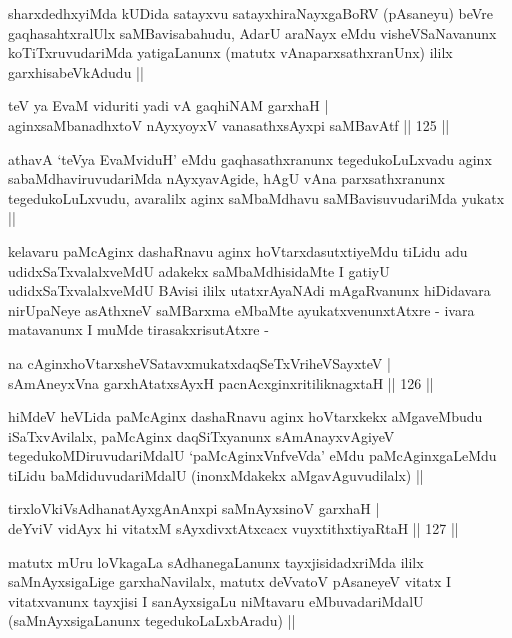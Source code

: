 \begin{artha}
sharxdedhxyiMda kUDida satayxvu satayxhiraNayxgaBoRV (pAsaneyu) beVre
gaqhasahtxralUlx saMBavisabahudu, AdarU araNayx eMdu visheVSaNavanunx
koTiTxruvudariMda yatigaLanunx (matutx vAnaparxsathxranUnx) ililx
garxhisabeVkAdudu ||
\end{artha}


\begin{shl}
teV ya EvaM viduriti yadi vA gaqhiNAM garxhaH | \\
aginxsaMbanadhxtoV nAyxyoyxV vanasathxsAyxpi saMBavAtf \hfill|| 125 || 
\end{shl}

\begin{artha}
athavA `teVya EvaMviduH' eMdu gaqhasathxranunx tegedukoLuLxvadu aginx
sabaMdhaviruvudariMda nAyxyavAgide, hAgU vAna parxsathxranunx
tegedukoLuLxvudu, avaralilx aginx saMbaMdhavu saMBavisuvudariMda
yukatx ||
\end{artha}

\begin{artha}
kelavaru paMcAginx dashaRnavu aginx hoVtarxdasutxtiyeMdu tiLidu adu
udidxSaTxvalalxveMdU adakekx saMbaMdhisidaMte I gatiyU
udidxSaTxvalalxveMdU BAvisi ililx utatxrAyaNAdi mAgaRvanunx hiDidavara
nirUpaNeye asAthxneV saMBarxma eMbaMte ayukatxvenunxtAtxre - ivara
matavanunx I muMde tirasakxrisutAtxre -
\end{artha}

\begin{shl}
na cAginxhoVtarxsheVSatavxmukatxdaqSeTxVriheVSayxteV | \\
sAmAneyxVna garxhAtatxsAyxH pacnAcxginxritiliknagxtaH \hfill|| 126 || 
\end{shl}

\begin{artha}
hiMdeV heVLida paMcAginx dashaRnavu aginx hoVtarxkekx aMgaveMbudu
iSaTxvAvilalx, paMcAginx daqSiTxyanunx sAmAnayxvAgiyeV
tegedukoMDiruvudariMdalU `paMcAginxVnfveVda' eMdu paMcAginxgaLeMdu
tiLidu baMdiduvudariMdalU (inonxMdakekx aMgavAguvudilalx) ||
\end{artha}

\begin{shl}
tirxloVkiVsAdhanatAyxgAnAnxpi saMnAyxsinoV garxhaH | \\
deYviV vidAyx hi vitatxM sAyxdivxtAtxcacx vuyxtithxtiyaRtaH \hfill|| 127 || 
\end{shl}

\begin{artha}
matutx mUru loVkagaLa sAdhanegaLanunx tayxjisidadxriMda ililx
saMnAyxsigaLige garxhaNavilalx, matutx deVvatoV pAsaneyeV vitatx I
vitatxvanunx tayxjisi I sanAyxsigaLu niMtavaru eMbuvadariMdalU
(saMnAyxsigaLanunx tegedukoLaLxbAradu) ||
\end{artha}

